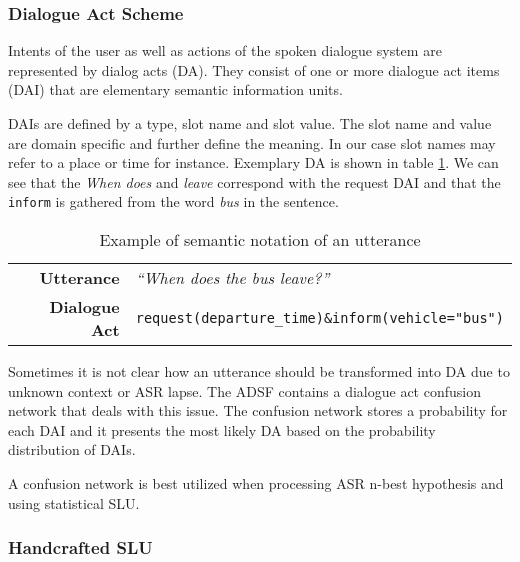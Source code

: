 \subsubsection{Dialogue Act Scheme}

Intents of the user as well as actions of the spoken dialogue system are represented by dialog acts (DA).
They consist of one or more dialogue act items (DAI) that are elementary semantic information units.

DAIs are defined by a type, slot name and slot value.
The slot name and value are domain specific and further define the meaning.
In our case slot names may refer to a place or time for instance.
Exemplary DA is shown in table \ref{table:utterance}.
We can see that the \textit{When does} and \textit{leave} correspond with the request DAI and that the \texttt{inform} is gathered from the word \textit{bus} in the sentence.

\begin{table}[h]
\centering
\begin{tabular}{ r | l }
	\textbf{Utterance} & \textit{``When does the bus leave?''} \\
	\textbf{Dialogue Act} & \texttt{request(departure\_time)\&inform(vehicle="bus")}
\end{tabular}
\caption[Semantic notation of an utterance]{Example of semantic notation of an utterance}
\label{table:utterance}
\end{table}

Sometimes it is not clear how an utterance should be transformed into DA due to unknown context or ASR lapse.
The ADSF contains a dialogue act confusion network that deals with this issue. %
The confusion network stores a probability for each DAI and it presents the most likely DA based on the probability distribution of DAIs.

A confusion network is best utilized when processing ASR n-best hypothesis and using statistical SLU.

\subsubsection{Handcrafted SLU}

